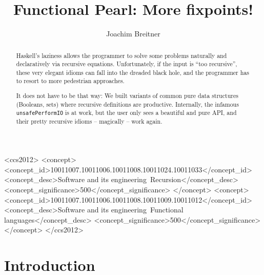 \documentclass[manuscript,screen,acmsmall]{acmart}
\begin{document}
\title{Functional Pearl: More fixpoints!}

\author{Joachim Breitner}


\begin{abstract}
Haskell’s laziness allows the programmer to solve some problems naturally and declaratively via recursive equations. Unfortunately, if the input is “too recursive”, these very elegant idioms can fall into the dreaded black hole, and the programmer has to resort to more pedestrian approaches.

It does not have to be that way: We built variants of common pure data structures (Booleans, sets) where recursive definitions are productive. Internally, the infamous \texttt{unsafePerformIO} is at work, but the user only sees a beautiful and pure API, and their pretty recursive idioms -- magically -- work again.

\end{abstract}

\begin{CCSXML}
<ccs2012>
   <concept>
       <concept_id>10011007.10011006.10011008.10011024.10011033</concept_id>
       <concept_desc>Software and its engineering~Recursion</concept_desc>
       <concept_significance>500</concept_significance>
       </concept>
   <concept>
       <concept_id>10011007.10011006.10011008.10011009.10011012</concept_id>
       <concept_desc>Software and its engineering~Functional languages</concept_desc>
       <concept_significance>500</concept_significance>
       </concept>
 </ccs2012>
\end{CCSXML}



\maketitle

\section{Introduction}
\end{document}
